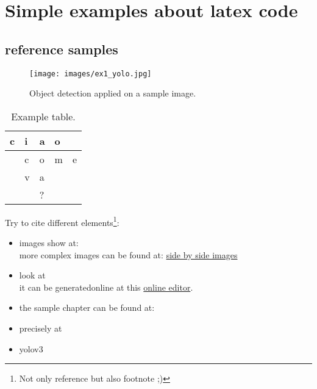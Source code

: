 \chapter*{Simple examples about latex code}
\label{cha:samples}

\section{reference samples}
\label{sec:refSamples}

\begin{figure}[!h]
	\centering
	\texttt{[image: images/ex1\_yolo.jpg]} %
	\caption{Object detection applied on a sample image.}
	\label{fig:sampleYolo}
\end{figure}

\begin{table}[h]
	\centering
	\begin{tabular}{ll|l|ll}
		\cline{1-4}
		\multicolumn{1}{|l|}{c} & i & a & \multicolumn{1}{l|}{o} &                        \\ \hline
		\multicolumn{1}{l|}{}   & c & o & \multicolumn{1}{l|}{m} & \multicolumn{1}{l|}{e} \\ \cline{2-5} 
		\multicolumn{1}{l|}{}   & v & a &                        &                        \\ \cline{2-3}
		&   & ? &                        &                        \\ \cline{3-3}
	\end{tabular}
	\caption{Example table.}
	\label{tab:sampleTable}
\end{table}

Try to cite different elements\footnote{Not only reference but also footnote ;)}:
\begin{itemize}
	\item images show at: \\
		  more complex images can be found at: \href{https://tex.stackexchange.com/questions/37581/latex-figures-side-by-side}{side by side images}
	\item look at \\
	it can be generatedonline at this \href{https://www.tablesgenerator.com/}{online editor}.
	\item the sample chapter can be found at: 
	\item precisely at 
	\item yolov3 \cite{yoloV3}
\end{itemize}


